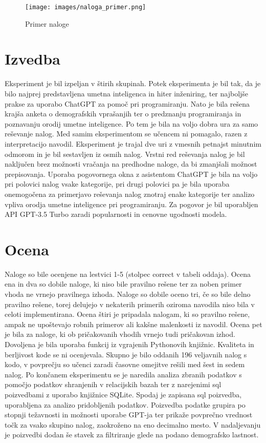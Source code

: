 \documentclass[a4paper,12pt,openright]{book}
\begin{document}
\begin{figure}[H]
    \centering
    \texttt{[image: images/naloga\_primer.png]}
    \caption{Primer naloge}
    \label{fig:enter-label}
\end{figure}

\section{Izvedba}




Eksperiment je bil izpeljan v štirih skupinah. Potek eksperimenta je bil tak, da je bilo najprej predstavljena umetna inteligenca in hiter inženiring, ter najboljše prakse za uporabo ChatGPT za pomoč pri programiranju. Nato je bila rešena krajša anketa o demografskih vprašanjih ter o predznanju programiranja in poznavanju orodij umetne inteligence. Po tem je bila na voljo dobra ura za samo reševanje nalog. Med samim eksperimentom se učencem ni pomagalo, razen z interpretacijo navodil.
Eksperiment je trajal dve uri z vmesnih petnajst minutnim odmorom in je bil sestavljen iz osmih nalog. Vrstni red reševanja nalog je bil naključen brez možnosti vračanja na predhodne naloge, da bi zmanjšali možnost prepisovanja. Uporaba pogovornega okna z asistentom ChatGPT je bila na voljo pri polovici nalog vsake kategorije, pri drugi polovici pa je bila uporaba onemogočena za primerjavo reševanja nalog znotraj enake kategorije ter analizo vpliva orodja umetne inteligence pri programiranju. Za pogovor je bil uporabljen API GPT-3.5 Turbo zaradi popularnosti in cenovne ugodnosti modela.

\section{Ocena}
Naloge so bile ocenjene na lestvici 1-5 (stolpec correct v tabeli oddaja). Ocena ena in dva so dobile naloge, ki niso bile pravilno rešene ter za noben primer vhoda ne vrnejo pravilnega izhoda. Naloge so dobile oceno tri, če so bile delno pravilno rešene, torej delujejo v nekaterih primerih oziroma navodila niso bila v celoti implementirana. Ocena štiri je pripadala nalogam, ki so pravilno rešene, ampak ne upoštevajo robnih primerov ali kakšne malenkosti iz navodil. Ocena pet je bila za naloge, ki ob pričakovanih vhodih vrnejo tudi pričakovan izhod. Dovoljena je bila uporaba funkcij iz vgrajenih Pythonovih knjižnic. Kvaliteta in berljivost kode se ni ocenjevala. Skupno je bilo oddanih 196 veljavnih nalog s kodo, v povprečju so učenci zaradi časovne omejitve rešili med šest in sedem nalog. 
Po končanem eksperimentu se je naredila analiza zbranih podatkov s pomočjo podatkov shranjenih v relacijskih bazah ter z narejenimi sql poizvedbami z uporabo knjižnice SQLite.
Spodaj je zapisana sql poizvedba, uporabljena za analizo pridobljenih podatkov. Poizvedba podatke grupira po stopnji težavnosti in možnosti uporabe GPT-ja ter prikaže povprečno vrednost točk za vsako skupino nalog, zaokroženo na eno decimalno mesto. V nadaljevanju je poizvedbi dodan še stavek za filtriranje glede na podano demografsko lastnost.
\end{document}
